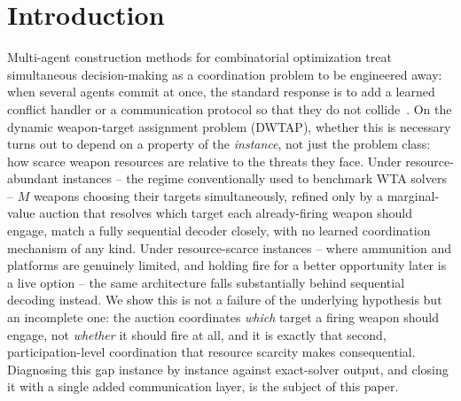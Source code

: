 \section{Introduction}
\label{sec:introduction}

Multi-agent construction methods for combinatorial optimization treat simultaneous decision-making as a coordination problem to be engineered away: when several agents commit at once, the standard response is to add a learned conflict handler or a communication protocol so that they do not collide~\cite{parco2024,sukhbaatar2016commnet,das2019tarmac}. On the dynamic weapon-target assignment problem (DWTAP), whether this is necessary turns out to depend on a property of the \emph{instance}, not just the problem class: how scarce weapon resources are relative to the threats they face. Under resource-abundant instances -- the regime conventionally used to benchmark WTA solvers -- $M$ weapons choosing their targets simultaneously, refined only by a marginal-value auction that resolves which target each already-firing weapon should engage, match a fully sequential decoder closely, with no learned coordination mechanism of any kind. Under resource-scarce instances -- where ammunition and platforms are genuinely limited, and holding fire for a better opportunity later is a live option -- the same architecture falls substantially behind sequential decoding instead. We show this is not a failure of the underlying hypothesis but an incomplete one: the auction coordinates \emph{which} target a firing weapon should engage, not \emph{whether} it should fire at all, and it is exactly that second, participation-level coordination that resource scarcity makes consequential. Diagnosing this gap instance by instance against exact-solver output, and closing it with a single added communication layer, is the subject of this paper.

